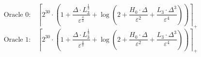 \[\text{Oracle 0:}\quad \left\lceil 2^{30} \cdot \left(1 + \frac{\Delta \cdot L_3^{\frac{1}{3}}}{\varepsilon^{\frac{4}{3}}} + \log\left(2 + \frac{H_0 \cdot \Delta}{\varepsilon^{2}} + \frac{L_3 \cdot \Delta^{3}}{\varepsilon^{4}}\right)\right) \right\rceil_{+}\]
\[\text{Oracle 1:}\quad \left\lceil 2^{30} \cdot \left(1 + \frac{\Delta \cdot L_3^{\frac{1}{3}}}{\varepsilon^{\frac{4}{3}}} + \log\left(2 + \frac{H_0 \cdot \Delta}{\varepsilon^{2}} + \frac{L_3 \cdot \Delta^{3}}{\varepsilon^{4}}\right)\right) \right\rceil_{+}\]
